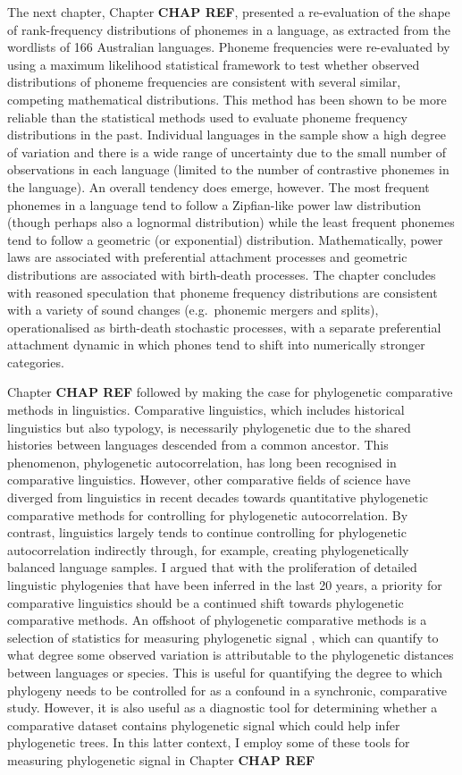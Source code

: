 The next chapter, Chapter \textbf{CHAP REF}, presented a re-evaluation of the shape of rank-frequency distributions of phonemes in a language, as extracted from the wordlists of 166 Australian languages. Phoneme frequencies were re-evaluated by using a maximum likelihood statistical framework \autocite{clauset_power-law_2009} to test whether observed distributions of phoneme frequencies are consistent with several similar, competing mathematical distributions. This method has been shown to be more reliable than the statistical methods used to evaluate phoneme frequency distributions in the past. Individual languages in the sample show a high degree of variation and there is a wide range of uncertainty due to the small number of observations in each language (limited to the number of contrastive phonemes in the language). An overall tendency does emerge, however. The most frequent phonemes in a language tend to follow a Zipfian-like power law distribution (though perhaps also a lognormal distribution) while the least frequent phonemes tend to follow a geometric (or exponential) distribution. Mathematically, power laws are associated with preferential attachment processes and geometric distributions are associated with birth-death processes. The chapter concludes with reasoned speculation that phoneme frequency distributions are consistent with a variety of sound changes (e.g.~phonemic mergers and splits), operationalised as birth-death stochastic processes, with a separate preferential attachment dynamic in which phones tend to shift into numerically stronger categories.

Chapter \textbf{CHAP REF} followed by making the case for phylogenetic comparative methods in linguistics. Comparative linguistics, which includes historical linguistics but also typology, is necessarily phylogenetic due to the shared histories between languages descended from a common ancestor. This phenomenon, phylogenetic autocorrelation, has long been recognised in comparative linguistics. However, other comparative fields of science have diverged from linguistics in recent decades towards quantitative phylogenetic comparative methods for controlling for phylogenetic autocorrelation. By contrast, linguistics largely tends to continue controlling for phylogenetic autocorrelation indirectly through, for example, creating phylogenetically balanced language samples. I argued that with the proliferation of detailed linguistic phylogenies that have been inferred in the last 20 years, a priority for comparative linguistics should be a continued shift towards phylogenetic comparative methods. An offshoot of phylogenetic comparative methods is a selection of statistics for measuring phylogenetic signal \autocite[e.g.][]{blomberg_testing_2003}, which can quantify to what degree some observed variation is attributable to the phylogenetic distances between languages or species. This is useful for quantifying the degree to which phylogeny needs to be controlled for as a confound in a synchronic, comparative study. However, it is also useful as a diagnostic tool for determining whether a comparative dataset contains phylogenetic signal which could help infer phylogenetic trees. In this latter context, I employ some of these tools for measuring phylogenetic signal in Chapter \textbf{CHAP REF}

